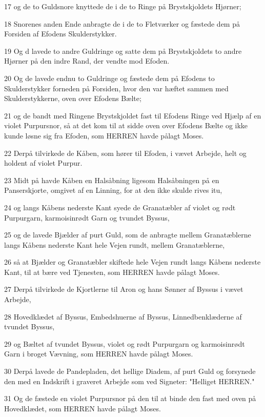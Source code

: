 \par 17 og de to Guldsnore knyttede de i de to Ringe på Brystskjoldets Hjørner;
\par 18 Snorenes anden Ende anbragte de i de to Fletværker og fæstede dem på Forsiden af Efodens Skulderstykker.
\par 19 Og d lavede to andre Guldringe og satte dem på Brystskjoldets to andre Hjørner på den indre Rand, der vendte mod Efoden.
\par 20 Og de lavede endnu to Guldringe og fæstede dem på Efodens to Skulderstykker forneden på Forsiden, hvor den var hæftet sammen med Skulderstykkerne, oven over Efodens Bælte;
\par 21 og de bandt med Ringene Brystskjoldet fast til Efodens Ringe ved Hjælp af en violet Purpursnor, så at det kom til at sidde oven over Efodens Bælte og ikke kunde løsne sig fra Efoden, som HERREN havde pålagt Moses.
\par 22 Derpå tilvirkede de Kåben, som hører til Efoden, i vævet Arbejde, helt og holdent af violet Purpur.
\par 23 Midt på havde Kåben en Halsåbning ligesom Halsåbningen på en Panserskjorte, omgivet af en Linning, for at den ikke skulde rives itu,
\par 24 og langs Kåbens nederste Kant syede de Granatæbler af violet og rødt Purpurgarn, karmoisinrødt Garn og tvundet Byssus,
\par 25 og de lavede Bjælder af purt Guld, som de anbragte mellem Granatæblerne langs Kåbens nederste Kant hele Vejen rundt, mellem Granatæblerne,
\par 26 så at Bjælder og Granatæbler skiftede hele Vejen rundt langs Kåbens nederste Kant, til at bære ved Tjenesten, som HERREN havde pålagt Moses.
\par 27 Derpå tilvirkede de Kjortlerne til Aron og hans Sønner af Byssus i vævet Arbejde,
\par 28 Hovedklædet af Byssus, Embedshuerne af Byssus, Linnedbenklæderne af tvundet Byssus,
\par 29 og Bæltet af tvundet Byssus, violet og rødt Purpurgarn og karmoisinrødt Garn i broget Vævning, som HERREN havde pålagt Moses.
\par 30 Derpå lavede de Pandepladen, det hellige Diadem, af purt Guld og forsynede den med en Indskrift i graveret Arbejde som ved Signeter: "Helliget HERREN."
\par 31 Og de fæstede en violet Purpursnor på den til at binde den fast med oven på Hovedklædet, som HERREN havde pålagt Moses.
